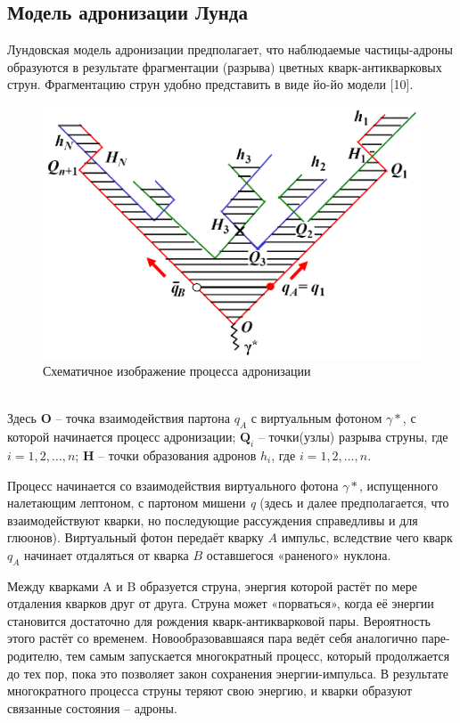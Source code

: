 \documentclass{extarticle}
\begin{document}
\subsection{Модель адронизации Лунда}
Лундовская модель адронизации предполагает, что наблюдаемые частицы-адроны образуются в результате фрагментации (разрыва) цветных кварк-антикварковых струн. Фрагментацию струн удобно представить в виде йо-йо модели [10]. 
\begin{figure}[h]
    \centering
    \includegraphics[width = 0.7\linewidth]{fragmentation.png}
    \caption{Схематичное изображение процесса адронизации}
    \label{fig:hadronization}
\end{figure} 
\\
Здесь \textbf{O} – точка взаимодействия партона $q_A$ с виртуальным фотоном $\gamma*$, с которой начинается процесс адронизации; $\textbf{Q}_i$ – точки(узлы) разрыва струны, где $i = 1, 2, \dots, n$; \textbf{H} -- точки образования адронов $h_i$, где $i = 1, 2, \dots, n$.

Процесс начинается со взаимодействия виртуального фотона $\gamma*$, испущенного налетающим лептоном, с партоном мишени \textit{q} (здесь и далее предполагается, что взаимодействуют кварки, но последующие рассуждения справедливы и для глюонов). Виртуальный фотон передаёт кварку $A$ импульс, вследствие чего кварк $q_A$ начинает отдаляться от кварка $B$ оставшегося «раненого» нуклона. 

Между кварками A и B образуется струна, энергия которой растёт по мере отдаления кварков друг от друга. Струна может «порваться», когда её энергии становится достаточно для рождения кварк-антикварковой пары. Вероятность этого растёт со временем. Новообразовавшаяся пара ведёт себя аналогично паре-родителю, тем самым запускается многократный процесс, который продолжается до тех пор, пока это позволяет закон сохранения энергии-импульса. В результате многократного процесса струны теряют свою энергию, и кварки образуют связанные состояния – адроны. 
\end{document}
